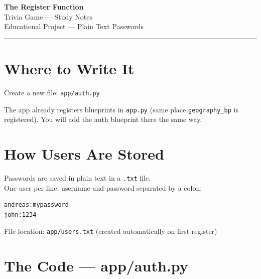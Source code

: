 \documentclass[12pt, a4paper]{article}
\begin{document}
\begin{center}
    {\LARGE \textbf{The Register Function}}\\[0.5em]
    {\large Trivia Game --- Study Notes}\\[0.3em]
    {\small Educational Project --- Plain Text Passwords}
\end{center}

\vspace{1em}
\hrule
\vspace{1.5em}

\section{Where to Write It}

Create a new file: \texttt{app/auth.py}

The app already registers blueprints in \texttt{app.py} (same place \texttt{geography\_bp} is registered).
You will add the auth blueprint there the same way.

\section{How Users Are Stored}

Passwords are saved in plain text in a \texttt{.txt} file.\\
One user per line, username and password separated by a colon:

\begin{lstlisting}
andreas:mypassword
john:1234
\end{lstlisting}

File location: \texttt{app/users.txt} (created automatically on first register)

\section{The Code --- app/auth.py}
\end{document}

